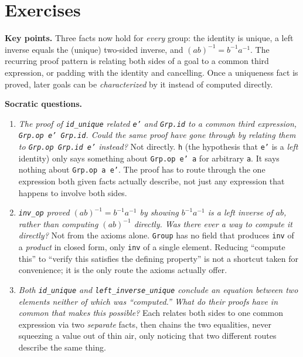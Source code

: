 \section{Exercises}\label{sec:07-group-theorems:05-exercises:1}

\textbf{Key points.} Three facts now hold for \emph{every} group: the identity is unique, a left inverse equals the (unique) two-sided inverse, and \((ab)^{-1}=b^{-1}a^{-1}\). The recurring proof pattern is relating both sides of a goal to a common third expression, or padding with the identity and cancelling. Once a uniqueness fact is proved, later goals can be \emph{characterized} by it instead of computed directly.

\textbf{Socratic questions.}

\begin{enumerate}
\def\labelenumi{\arabic{enumi}.}
\item
  \emph{The proof of \texttt{id\_\allowbreak{}unique} related \texttt{e'} and \texttt{Grp.id} to a common third expression, \texttt{Grp.op e' Grp.id}. Could the same proof have gone through by relating them to \texttt{Grp.op Grp.id e'} instead?} Not directly. \texttt{h} (the hypothesis that \texttt{e'} is a \emph{left} identity) only says something about \texttt{Grp.op e' a} for arbitrary \texttt{a}. It says nothing about \texttt{Grp.op a e'}. The proof has to route through the one expression both given facts actually describe, not just any expression that happens to involve both sides.
\item
  \emph{\texttt{inv\_\allowbreak{}op} proved \((ab)^{-1}=b^{-1}a^{-1}\) by showing \(b^{-1}a^{-1}\) is a left inverse of \(ab\), rather than computing \((ab)^{-1}\) directly. Was there ever a way to compute it directly?} Not from the axioms alone. \texttt{Group} has no field that produces \texttt{inv} of a \emph{product} in closed form, only \texttt{inv} of a single element. Reducing ``compute this'' to ``verify this satisfies the defining property'' is not a shortcut taken for convenience; it is the only route the axioms actually offer.
\item
  \emph{Both \texttt{id\_\allowbreak{}unique} and \texttt{left\_\allowbreak{}inverse\_\allowbreak{}unique} conclude an equation between two elements neither of which was ``computed.'' What do their proofs have in common that makes this possible?} Each relates both sides to one common expression via two \emph{separate} facts, then chains the two equalities, never squeezing a value out of thin air, only noticing that two different routes describe the same thing.

\end{enumerate}
